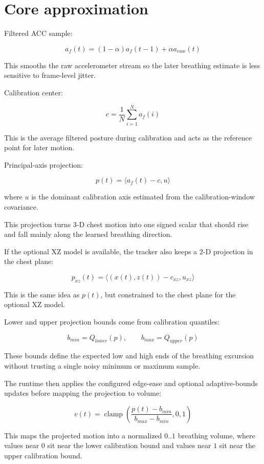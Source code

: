 \documentclass[11pt]{article}
\begin{document}
\section*{Core approximation}

Filtered ACC sample:

\[
a_f(t) = (1 - \alpha)a_f(t-1) + \alpha a_{raw}(t)
\]

This smooths the raw accelerometer stream so the later breathing estimate is
less sensitive to frame-level jitter.

Calibration center:

\[
c = \frac{1}{N}\sum_{i=1}^{N} a_f(i)
\]

This is the average filtered posture during calibration and acts as the
reference point for later motion.

Principal-axis projection:

\[
p(t) = \langle a_f(t) - c, u \rangle
\]

where $u$ is the dominant calibration axis estimated from the calibration-window
covariance.

This projection turns 3-D chest motion into one signed scalar that should rise
and fall mainly along the learned breathing direction.

If the optional XZ model is available, the tracker also keeps a 2-D projection
in the chest plane:

\[
p_{xz}(t) = \langle (x(t), z(t)) - c_{xz}, u_{xz} \rangle
\]

This is the same idea as $p(t)$, but constrained to the chest plane for the
optional XZ model.

Lower and upper projection bounds come from calibration quantiles:

\[
b_{min} = Q_{lower}(p), \qquad b_{max} = Q_{upper}(p)
\]

These bounds define the expected low and high ends of the breathing excursion
without trusting a single noisy minimum or maximum sample.

The runtime then applies the configured edge-ease and optional adaptive-bounds
updates before mapping the projection to volume:

\[
v(t) = \operatorname{clamp}\left(\frac{p(t) - b_{min}}{b_{max} - b_{min}}, 0, 1\right)
\]

This maps the projected motion into a normalized $0..1$ breathing volume, where
values near $0$ sit near the lower calibration bound and values near $1$ sit
near the upper calibration bound.
\end{document}
